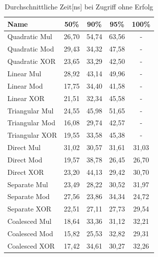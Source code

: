 \begin{table}[!ht]
\begin{tabular}{l|cccc}
    Name & 50\% & 90\% & 95\% & 100\% \\
    \hline
    Quadratic Mul & 26,70 & 54,74 & 63,56 & - \\
    Quadratic Mod & 29,43 & 34,32 & 47,58 & - \\
    Quadratic XOR & 23,65 & 33,29 & 42,50 & - \\
    \hline
    Linear Mul & 28,92 & 43,14 & 49,96 & - \\
    Linear Mod & 17,75 & 34,40 & 41,58 & - \\
    Linear XOR & 21,51 & 32,34 & 45,58 & - \\
    \hline
    Triangular Mul & 24,55 & 45,98 & 51,65 & - \\
    Triangular Mod & 16,08 & 29,74 & 42,57 & - \\
    Triangular XOR & 19,55 & 33,58 & 45,38 & - \\
    \hline
    Direct Mul & 31,02 & 30,57 & 31,61 & 31,03 \\
    Direct Mod & 19,57 & 38,78 & 26,45 & 26,70 \\
    Direct XOR & 23,20 & 44,13 & 29,42 & 30,70 \\
    \hline
    Separate Mul & 23,49 & 28,22 & 30,52 & 31,97 \\
    Separate Mod & 27,56 & 23,86 & 34,34 & 24,72 \\
    Separate XOR & 22,51 & 27,11 & 27,73 & 29,54 \\
    \hline
    Coalesced Mul & 18,64 & 33,36 & 31,12 & 32,21 \\
    Coalesced Mod & 15,82 & 25,53 & 32,82 & 29,31 \\
    Coalesced XOR & 17,42 & 34,61 & 30,27 & 32,26 \\
\end{tabular}
\centering
\caption{Durchschnittliche Zeit[ns] bei Zugriff ohne Erfolg}
\end{table}
\FloatBarrier
